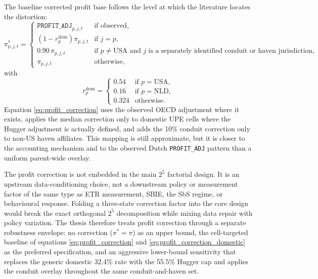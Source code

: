 \documentclass[11pt,a4paper]{article}
\newcommand{\code}[1]{\texttt{#1}}
\begin{document}
The baseline corrected profit base follows the level at which the literature locates the distortion:
\begin{equation}\label{eq:profit_correction}
\pi_{p,j,t}^{*} =
\begin{cases}
\code{PROFIT\_ADJ}_{p,j,t} & \text{if observed}, \\[4pt]
\left(1-r_{p}^{\text{dom}}\right)\pi_{p,j,t} & \text{if } j=p, \\[4pt]
0.90\,\pi_{p,j,t} & \text{if } p \neq \text{USA} \text{ and } j \text{ is a separately identified conduit or haven jurisdiction}, \\[4pt]
\pi_{p,j,t} & \text{otherwise,}
\end{cases}
\end{equation}
with
\begin{equation}\label{eq:profit_correction_domestic}
r_{p}^{\text{dom}} =
\begin{cases}
0.54 & \text{if } p=\text{USA}, \\[2pt]
0.16 & \text{if } p=\text{NLD}, \\[2pt]
0.324 & \text{otherwise.}
\end{cases}
\end{equation}
Equation \eqref{eq:profit_correction} uses the observed OECD adjustment where it exists, applies the \citet{hugger2026} median correction only to domestic UPE cells where the Hugger adjustment is actually defined, and adds the \citet{garcia-bernardo2022a} 10\% conduit correction only to non-US haven affiliates. This mapping is still approximate, but it is closer to the accounting mechanism and to the observed Dutch \code{PROFIT\_ADJ} pattern than a uniform parent-wide overlay.

The profit correction is not embedded in the main $2^5$ factorial design. It is an upstream data-conditioning choice, not a downstream policy or measurement factor of the same type as ETR measurement, SBIE, the SbS regime, or behavioural response. Folding a three-state correction factor into the core design would break the exact orthogonal $2^5$ decomposition while mixing data repair with policy variation. The thesis therefore treats profit correction through a separate robustness envelope: no correction ($\pi^*=\pi$) as an upper bound, the cell-targeted baseline of equations \eqref{eq:profit_correction} and \eqref{eq:profit_correction_domestic} as the preferred specification, and an aggressive lower-bound sensitivity that replaces the generic domestic 32.4\% rate with the 55.5\% Hugger cap and applies the conduit overlay throughout the same conduit-and-haven set.
\end{document}
